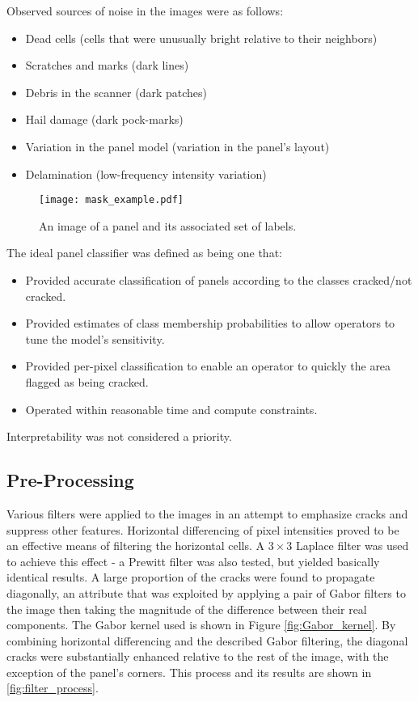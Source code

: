 \documentclass[11pt]{article} %
\begin{document}
Observed sources of noise in the images were as follows:
\begin{itemize}
	\item Dead cells (cells that were unusually bright relative to their neighbors)
	\item Scratches and marks (dark lines)
	\item Debris in the scanner (dark patches)
	\item Hail damage (dark pock-marks)
	\item Variation in the panel model (variation in the panel's layout)
	\item Delamination (low-frequency intensity variation)
\end{itemize}

\begin{figure}[h!]
\centering
\texttt{[image: mask\_example.pdf]}
\caption{An image of a panel and its associated set of labels.}
\label{fig:mask_example}
\end{figure}

The ideal panel classifier was defined as being one that:
\begin{itemize}
	\item Provided accurate classification of panels according to the classes cracked/not cracked.
	\item Provided estimates of class membership probabilities to allow operators to tune the model's sensitivity.
	\item Provided per-pixel classification to enable an operator to quickly the area flagged as being cracked.
	\item Operated within reasonable time and compute constraints.
\end{itemize}
Interpretability was not considered a priority.


\subsection{Pre-Processing}
Various filters were applied to the images in an attempt to emphasize cracks and suppress other features. Horizontal differencing of pixel intensities proved to be an effective means of filtering the horizontal cells. A $3\times3$ Laplace filter was used to achieve this effect - a Prewitt filter was also tested, but yielded basically identical results.  A large proportion of the cracks were found to propagate diagonally, an attribute that was exploited by applying a pair of Gabor filters to the image then taking the magnitude of the difference between their real components. The Gabor kernel used is shown in Figure \ref{fig:Gabor_kernel}. By combining horizontal differencing and the described Gabor filtering, the diagonal cracks were substantially enhanced relative to the rest of the image, with the exception of the panel's corners. This process and its results are shown in \ref{fig:filter_process}.
\end{document}
